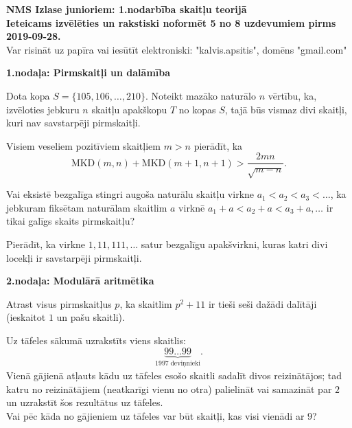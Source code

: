 \documentclass[11pt]{article}
\begin{document}
\begin{center}
{\Large \bf NMS Izlase junioriem: 1.nodarbība skaitļu teorijā}\\
{\bf Ieteicams izvēlēties un rakstiski noformēt 
5 no 8 uzdevumiem pirms 2019-09-28.}\\
{Var risināt uz papīra vai iesūtīt elektroniski: "kalvis.apsitis", domēns "gmail.com"}
\end{center}

\vspace{10pt}
{\bf \large 1.nodaļa: Pirmskaitļi un dalāmība}

\begin{problem}
Dota kopa $S = \{ 105,106,\ldots,210 \}$. Noteikt mazāko 
naturālo $n$ vērtību, ka, izvēloties jebkuru $n$ skaitļu 
apakškopu $T$ no kopas $S$, tajā būs vismaz divi skaitļi, kuri nav 
savstarpēji pirmskaitļi. 
\end{problem}

\begin{problem}
Visiem veseliem pozitīviem skaitļiem $m > n$ pierādīt, ka 
$$\mbox{MKD}(m,n) + \mbox{MKD}(m+1,n+1) > \frac{2mn}{\sqrt{m-n}}.$$
\end{problem}

\begin{problem}
Vai eksistē bezgalīga 
stingri augoša naturālu skaitļu virkne $a_1 < a_2 < a_3 <\ldots$, 
ka jebkuram fiksētam naturālam skaitlim $a$ virknē $a_1+a < a_2+a < a_3 + a,\ldots$ 
ir tikai galīgs skaits pirmskaitļu? 
\end{problem}

\begin{problem}
Pierādīt, ka virkne $1,11,111,\ldots$ satur bezgalīgu apakšvirkni, 
kuras katri divi locekļi ir savstarpēji pirmskaitļi.
\end{problem}


\vspace{10pt}
{\bf \large 2.nodaļa: Modulārā aritmētika}


\begin{problem}
Atrast visus pirmskaitļus $p$, ka skaitlim $p^2 + 11$ ir tieši 
seši dažādi dalītāji (ieskaitot $1$ un pašu skaitli).
\end{problem}

\begin{problem}
Uz tāfeles sākumā uzrakstīts viens skaitlis: 
$$\underbrace{99\ldots{}99}_{1997\;\text{deviņnieki}}.$$
Vienā gājienā atļauts kādu uz tāfeles esošo skaitli sadalīt 
divos reizinātājos; tad katru no reizinātājiem (neatkarīgi vienu no otra) 
palielināt vai samazināt par $2$ un uzrakstīt šos rezultātus uz tāfeles.\\
Vai pēc kāda no gājieniem uz tāfeles var būt skaitļi, kas visi vienādi ar $9$?
\end{problem}
\end{document}
